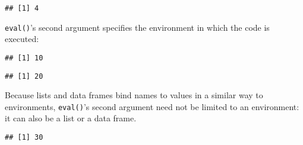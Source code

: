\begin{verbatim}
## [1] 4
\end{verbatim}

\texttt{eval()}'s second argument specifies the environment in which the
code is executed:

\begin{Shaded}
\begin{Highlighting}[]
\StringTok{ }
\NormalTok{(}
\end{Highlighting}
\end{Shaded}

\begin{verbatim}
## [1] 10
\end{verbatim}

\begin{Shaded}
\begin{Highlighting}[]
\StringTok{ }\NormalTok{()}
\OperatorTok{$}\StringTok{ }
\NormalTok{(}
\end{Highlighting}
\end{Shaded}

\begin{verbatim}
## [1] 20
\end{verbatim}

Because lists and data frames bind names to values in a similar way to
environments, \texttt{eval()}'s second argument need not be limited to
an environment: it can also be a list or a data frame.

\begin{Shaded}
\begin{Highlighting}[]
\NormalTok{(}\NormalTok{(} \NormalTok{))}
\end{Highlighting}
\end{Shaded}

\begin{verbatim}
## [1] 30
\end{verbatim}

\begin{Shaded}
\begin{Highlighting}[]
\NormalTok{(}\NormalTok{(} \NormalTok{))}
\end{Highlighting}
\end{Shaded}

